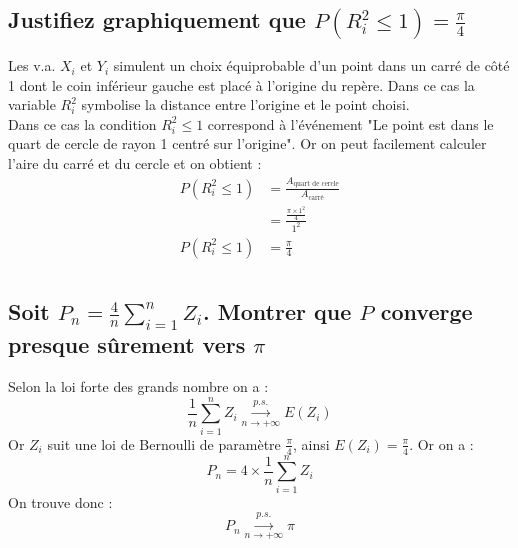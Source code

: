 \documentclass[10pt,a4paper,twoside]{article}
\begin{document}
\subsection{Justifiez graphiquement que $P(R^{2}_{i}\leqslant 1)=\frac{\pi}{4}$}
Les v.a. $X_{i}$ et $Y_{i}$ simulent un choix équiprobable d'un point dans un carré de côté 1 dont le coin inférieur gauche est placé à l'origine du repère. Dans ce cas la variable $R_{i}^{2}$ symbolise la distance entre l'origine et le point choisi.\\
Dans ce cas la condition $R_{i}^{2}\leqslant 1$ correspond à l’événement "Le point est dans le quart de cercle de rayon 1 centré sur l'origine". Or on peut facilement calculer l'aire du carré et du cercle et on obtient :
\begin{align*}
P(R^{2}_{i}\leqslant 1) &= \frac{A_{\text{quart de cercle}}}{A_{\text{carré}}}\\
 &= \frac{\frac{\pi \times 1^{2}}{4}}{1^{2}}\\
P(R^{2}_{i}\leqslant 1)&=\frac{\pi}{4}\\ 
\end{align*}

\subsection{Soit $P_{n}=\frac{4}{n}\sum_{i=1}^{n}Z_{i}$. Montrer que $P$ converge presque sûrement vers $\pi$}
Selon la loi forte des grands nombre on a :
\[ \frac{1}{n}\sum_{i=1}^{n}Z_{i} \overset{p.s.}{\underset{n\rightarrow+\infty}{\longrightarrow}} E(Z_{i}) \]
Or $Z_{i}$ suit une loi de Bernoulli de paramètre $\frac{\pi}{4}$, ainsi $E(Z_{i}) = \frac{\pi}{4}$. Or on a :
\[ P_{n}=4 \times \frac{1}{n}\sum_{i=1}^{n}Z_{i} \]
On trouve donc :
\[ P_{n} \overset{p.s.}{\underset{n\rightarrow+\infty}{\longrightarrow}} \pi \]
\end{document}
